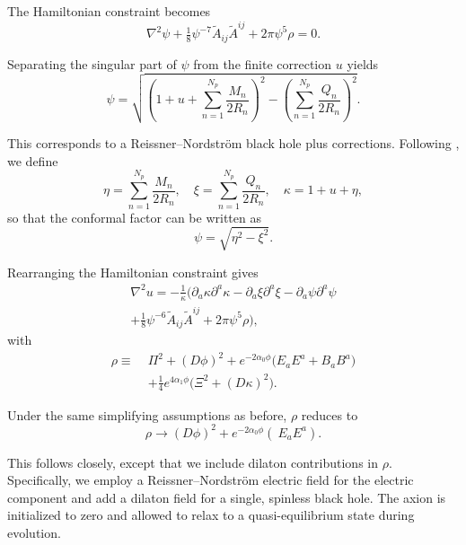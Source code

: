 The Hamiltonian constraint becomes
\begin{equation}
    \nabla^2 \psi + \tfrac{1}{8} \psi^{-7} \tilde{A}_{ij} \tilde{A}^{ij} + 2\pi \psi^5 \rho = 0.
\end{equation}

Separating the singular part of $\psi$ from the finite correction $u$ yields
\begin{equation}
    \psi = \sqrt{\left(1+u +\sum_{n=1}^{N_p}\frac{M_n}{2R_n}\right)^2 
    -\left( \sum_{n=1}^{N_p}\frac{Q_n}{2R_n} \right)^2 }.
\end{equation} 

This corresponds to a Reissner--Nordström black hole plus corrections. Following \cite{Bozzola2019}, we define
\begin{equation}
    \eta = \sum_{n=1}^{N_p}\frac{M_n}{2R_n}, \quad 
    \xi = \sum_{n=1}^{N_p}\frac{Q_n}{2R_n}, \quad 
    \kappa = 1+ u + \eta,
\end{equation}
so that the conformal factor can be written as
\begin{equation}
    \psi = \sqrt{\eta^2 - \xi^2 }.
\end{equation}

Rearranging the Hamiltonian constraint gives
\begin{multline}
    \nabla^2 u = -\frac{1}{\kappa} \Big(
    \partial_a \kappa \partial^a \kappa 
    - \partial_a \xi \partial^a \xi 
    - \partial_a \psi \partial^a \psi \\
    + \tfrac{1}{8} \psi^{-6} \tilde{A}_{ij} \tilde{A}^{ij}
    + 2 \pi \psi^{5} \rho
    \Big),
\end{multline}
with
\begin{equation}
\begin{split}
    \rho \equiv\;& \Pi^2 + (D\phi)^2 
    + e^{-2 \alpha_0 \phi}\big( E_a  E^a +  B_a  B^a\big) \\
    &+ \tfrac{1}{4} e^{4 \alpha_1 \phi}\big(\Xi^2 + (D\kappa)^2\big).
\end{split}
\end{equation}

Under the same simplifying assumptions as before, $\rho$ reduces to
\begin{equation}
    \rho \rightarrow (D\phi)^2 + e^{-2 \alpha_0 \phi}(\ E_a E^a).
\end{equation}

This follows \cite{Bozzola2019} closely, except that we include dilaton contributions in $\rho$. Specifically, we employ a Reissner--Nordström electric field for the electric component and add a dilaton field for a single, spinless black hole. The axion is initialized to zero and allowed to relax to a quasi-equilibrium state during evolution.  

